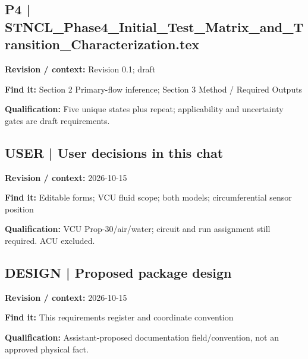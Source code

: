 \documentclass[11pt]{article}
\begin{document}
\begin{minipage}{\textwidth}\small
\subsection*{P4 | STNCL\_\allowbreak{}Phase4\_\allowbreak{}Initial\_\allowbreak{}Test\_\allowbreak{}Matrix\_\allowbreak{}and\_\allowbreak{}Transition\_\allowbreak{}Characterization.tex}
\textbf{Revision / context:} Revision 0.1; draft\par
\textbf{Find it:} Section 2 Primary-flow inference; Section 3 Method / Required Outputs\par
\textbf{Qualification:} Five unique states plus repeat; applicability and uncertainty gates are draft requirements.\par
\end{minipage}\par\vspace{5pt}
\begin{minipage}{\textwidth}\small
\subsection*{USER | User decisions in this chat}
\textbf{Revision / context:} 2026-10-15\par
\textbf{Find it:} Editable forms; VCU fluid scope; both models; circumferential sensor position\par
\textbf{Qualification:} VCU Prop-30/air/water; circuit and run assignment still required. ACU excluded.\par
\end{minipage}\par\vspace{5pt}
\par
\begin{minipage}{\textwidth}\small
\subsection*{DESIGN | Proposed package design}
\textbf{Revision / context:} 2026-10-15\par
\textbf{Find it:} This requirements register and coordinate convention\par
\textbf{Qualification:} Assistant-proposed documentation field/convention, not an approved physical fact.\par
\end{minipage}\par\vspace{5pt}
\end{document}
